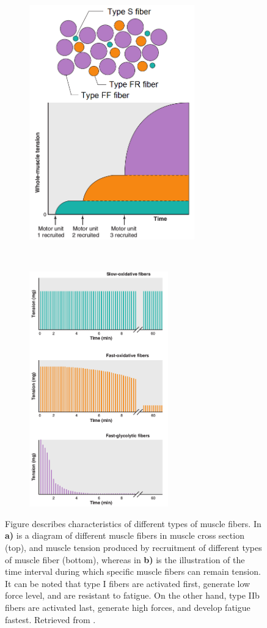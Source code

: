 \begin{figure}[t!]
    \centering
    \begin{subfigure}[t]{0.45\textwidth}
        \centering
        \includegraphics[height=4in]{Images/introduction/fiber_distribution.png}
        \caption{}
    \end{subfigure}%
    ~ 
    \begin{subfigure}[t]{0.45\textwidth}
        \centering
        \includegraphics[height=4in]{Images/introduction/fiber_fatigue.png}
        \caption{}
    \end{subfigure}
    \caption{Figure describes characteristics of different types of muscle fibers. In \textbf{a)} is a diagram of different muscle fibers in muscle cross section (top), and muscle tension produced by recruitment of different types of muscle fiber (bottom), whereas in \textbf{b)} is the illustration of the time interval during which specific muscle fibers can remain tension. It can be noted that type I fibers are activated first, generate low force level, and are resistant to fatigue. On the other hand, type IIb fibers are activated last, generate high forces, and develop fatigue fastest. Retrieved from \citet{Widmaier2014}.}
\label{fig:fibers}
\end{figure}


